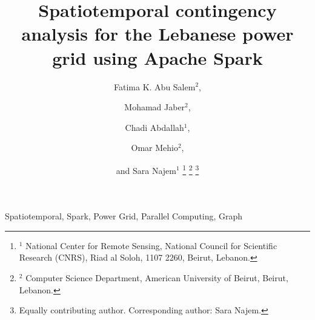 \documentclass[journal]{IEEEtran}
\begin{document}
\title{Spatiotemporal contingency analysis for the Lebanese power grid using Apache Spark}


\author{Fatima K. Abu Salem$^{2}$, \and
Mohamad  Jaber$^{2}$, \and 
Chadi Abdallah$^{1}$, \and 
Omar Mehio$^{2}$, \and and Sara Najem$^{1}$
\thanks{$^1$ National Center for Remote Sensing, National Council for Scientific Research (CNRS), Riad al Soloh, 1107 2260, Beirut, Lebanon.}
\thanks{$^2$ Computer Science Department, American University of Beirut, Beirut, Lebanon.}
\thanks{Equally contributing author. Corresponding author: Sara Najem.}
}



%
{}


\maketitle


\begin{IEEEkeywords}
Spatiotemporal, Spark, Power Grid, Parallel Computing, Graph
\end{IEEEkeywords}


\IEEEpeerreviewmaketitle

\maketitle









\end{document}
